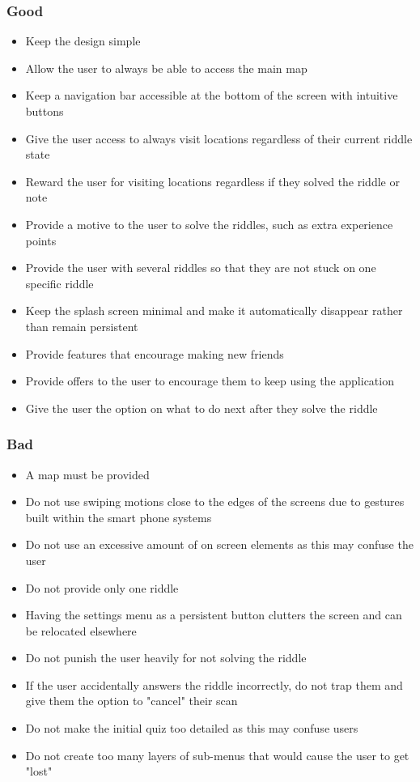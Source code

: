 \documentclass[10pt,twocolumn]{article} %
\begin{document}
\subsubsection*{Good}
\begin{itemize}[noitemsep]
  \item Keep the design simple
  \item Allow the user to always be able to access the main map
  \item Keep a navigation bar accessible at the bottom of the screen with intuitive buttons
  \item Give the user access to always visit locations regardless of their current riddle state
  \item Reward the user for visiting locations regardless if they solved the riddle or note
  \item Provide a motive to the user to solve the riddles, such as extra experience points
  \item Provide the user with several riddles so that they are not stuck on one specific riddle
  \item Keep the splash screen minimal and make it automatically disappear rather than remain persistent
  \item Provide features that encourage making new friends
  \item Provide offers to the user to encourage them to keep using the application
  \item Give the user the option on what to do next after they solve the riddle
\end{itemize}

\subsubsection*{Bad}
\begin{itemize}[noitemsep]
  \item A map must be provided
  \item Do not use swiping motions close to the edges of the screens due to gestures built within the smart phone systems
  \item Do not use an excessive amount of on screen elements as this may confuse the user
  \item Do not provide only one riddle
  \item Having the settings menu as a persistent button clutters the screen and can be relocated elsewhere
  \item Do not punish the user heavily for not solving the riddle
  \item If the user accidentally answers the riddle incorrectly, do not trap them and give them the option to "cancel" their scan
  \item Do not make the initial quiz too detailed as this may confuse users
  \item Do not create too many layers of sub-menus that would cause the user to get "lost"
\end{itemize}
\end{document}
